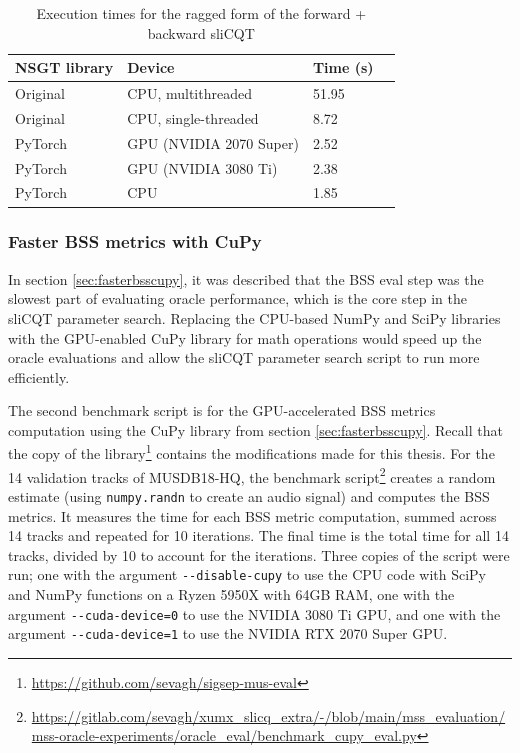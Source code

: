 \documentclass[report.tex]{subfiles}
\begin{document}
\begin{table}[ht]
	\centering
	\caption{Execution times for the ragged form of the forward + backward sliCQT}
	\label{table:nsgttorchresultsragged}
	\begin{tabular}{ |l|l|l|l| }
	 \hline
		NSGT library & Device & Time (s) \\
	 \hline
	 \hline
		Original & CPU, multithreaded & 51.95  \\
	 \hline
		Original & CPU, single-threaded & 8.72  \\
	 \hline
		PyTorch & GPU (NVIDIA 2070 Super) & 2.52 \\
	 \hline
		PyTorch & GPU (NVIDIA 3080 Ti) &  2.38 \\
	 \hline
		PyTorch & CPU & 1.85  \\
	 \hline
\end{tabular}
\end{table}

\subsubsection{Faster BSS metrics with CuPy}
\label{sec:bssmetricsresults}

In section \ref{sec:fasterbsscupy}, it was described that the BSS eval step was the slowest part of evaluating oracle performance, which is the core step in the sliCQT parameter search. Replacing the CPU-based NumPy and SciPy libraries with the GPU-enabled CuPy library for math operations would speed up the oracle evaluations and allow the sliCQT parameter search script to run more efficiently.

The second benchmark script is for the GPU-accelerated BSS metrics computation using the CuPy library from section \ref{sec:fasterbsscupy}. Recall that the copy of the library\footnote{\url{https://github.com/sevagh/sigsep-mus-eval}} contains the modifications made for this thesis. For the 14 validation tracks of MUSDB18-HQ, the benchmark script\footnote{\url{https://gitlab.com/sevagh/xumx_slicq_extra/-/blob/main/mss_evaluation/mss-oracle-experiments/oracle_eval/benchmark_cupy_eval.py}}  creates a random estimate (using \Verb#numpy.randn# to create an audio signal) and computes the BSS metrics. It measures the time for each BSS metric computation, summed across 14 tracks and repeated for 10 iterations. The final time is the total time for all 14 tracks, divided by 10 to account for the iterations. Three copies of the script were run; one with the argument \Verb#--disable-cupy# to use the CPU code with SciPy and NumPy functions on a Ryzen 5950X with 64GB RAM, one with the argument \Verb#--cuda-device=0# to use the NVIDIA 3080 Ti GPU, and one with the argument \Verb#--cuda-device=1# to use the NVIDIA RTX 2070 Super GPU.
\end{document}
